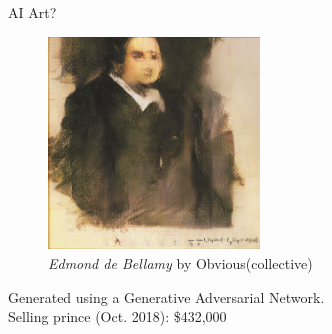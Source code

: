 \documentclass[handout, 10pt]{beamer}
\begin{document}
\begin{frame}{AI Art?}
    \begin{figure}
        \centering
        \includegraphics[width=0.5\textwidth]{fig/L3/478px-Edmond_de_Belamy.png}
        \caption*{\textit{Edmond de Bellamy} by Obvious(collective)}
    \end{figure}
    Generated using a Generative Adversarial Network.\\
    Selling prince (Oct. 2018): \$432,000
\end{frame}
\end{document}
